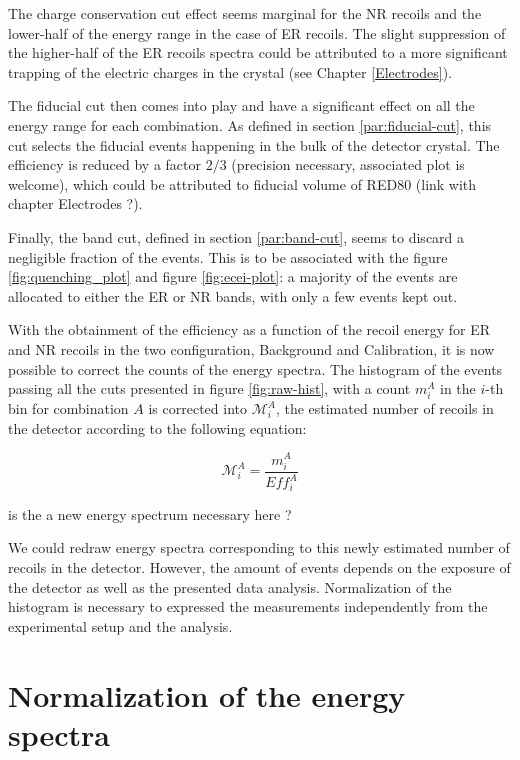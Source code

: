 The charge conservation cut effect seems marginal for the NR recoils and the lower-half of the energy range in the case of ER recoils. The slight suppression of the higher-half of the ER recoils spectra could be attributed to a more significant trapping of the electric charges in the crystal (see Chapter \ref{Electrodes}).

The fiducial cut then comes into play and have a significant effect on all the energy range for each combination. As defined in section \ref{par:fiducial-cut}, this cut selects the fiducial events happening in the bulk of the detector crystal. The efficiency is reduced by a factor $2/3$ (precision necessary, associated plot is welcome), which could be attributed to fiducial volume of RED80 (link with chapter Electrodes ?).

Finally, the band cut, defined in section \ref{par:band-cut}, seems to discard a negligible fraction of the events. This is to be associated with the figure \ref{fig:quenching_plot} and figure \ref{fig:ecei-plot}: a majority of the events are allocated to either the ER or NR bands, with only a few events kept out.

With the obtainment of the efficiency as a function of the recoil energy for ER and NR recoils in the two configuration, Background and Calibration, it is now possible to correct the counts of the energy spectra.
The histogram of the events passing all the cuts presented in figure \ref{fig:raw-hist}, with a count $m_{i}^{A}$ in the $i$-th bin for combination $A$ is corrected into $\mathcal{M}_{i}^{A}$, the estimated number of recoils in the detector according to the following equation:

\begin{equation}
\label{eq:efficiency-correction}
\mathcal{M}_{i}^{A} = \frac{ m_{i}^{A} }{ Eff_{i}^{A} }
\end{equation}

{\color{red} is the a new energy spectrum necessary here ?}

We could redraw energy spectra corresponding to this newly estimated number of recoils in the detector. However, the amount of events depends on the exposure of the detector as well as the presented data analysis. Normalization of the histogram is necessary to expressed the measurements independently from the experimental setup and the analysis.


\section{Normalization of the energy spectra}

